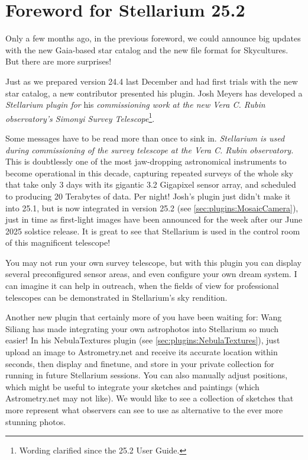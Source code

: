 
\chapter*{Foreword for Stellarium 25.2}
\label{ch:Foreword}

Only a few months ago, in the previous foreword, we could announce big updates with the 
new Gaia-based star catalog and the new file format for Skycultures. But there are more surprises!


Just as we prepared version 24.4 last December and had first trials with the new star catalog, a new contributor 
presented his plugin. Josh Meyers has developed a \emph{Stellarium plugin for} his \emph{commissioning work at the new
Vera C. Rubin observatory's Simonyi Survey Telescope}\footnote{Wording clarified since the 25.2 User Guide.}. 

Some messages have to be read more than once to sink in. 
\emph{Stellarium is used during commissioning of the survey telescope at the Vera C. Rubin observatory.}
This is doubtlessly one of the most jaw-dropping astronomical instruments to become 
operational in this decade, capturing repeated surveys of the whole sky that take only 3 days with its 
gigantic 3.2 Gigapixel sensor array, and scheduled to producing 20 Terabytes of data. Per night! 
Josh's plugin just didn't make it into 25.1, but is now integrated in version 25.2 (see \ref{sec:plugins:MosaicCamera}), 
just in time as first-light images have been announced for the week after our June 2025 solstice release.
It is great to see that Stellarium is used in the control room of this magnificent telescope!  

You may not run your own survey telescope, but with this plugin you can display several preconfigured sensor areas, 
and even configure your own dream system. I can imagine it can help in outreach, 
when the fields of view for professional telescopes can be demonstrated in Stellarium's sky rendition.


Another new plugin that certainly more of you have been waiting for: Wang Siliang has made 
integrating your own astrophotos into Stellarium so much easier! In his NebulaTextures plugin (see \ref{sec:plugins:NebulaTextures}), 
just upload an image to Astrometry.net and receive its accurate location within seconds, then display and finetune, 
and store in your private collection for running in future Stellarium sessions. You can also manually adjust positions, 
which might be useful to integrate your sketches and paintings (which Astrometry.net may not like). 
We would like to see a collection of sketches that more represent what observers can see to use as alternative 
to the ever more stunning photos.



